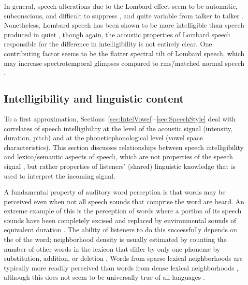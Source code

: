 In general, speech alterations due to the Lombard effect seem to be automatic, subconscious, and difficult to suppress \citep{PickEtAl1989}, and quite variable from talker to talker \citep{Junqua1993}.  Nonetheless, Lombard speech has been shown to be more intelligible than speech produced in quiet \citep{DreherONeill1957, SummersEtAl1988}, though again, the acoustic properties of Lombard speech responsible for the difference in intelligibility is not entirely clear.  One contributing factor seems to be the flatter spectral tilt of Lombard speech, which may increase spectrotemporal glimpses compared to \ac{rms}\=/matched normal speech \citep{LuCooke2009}.


\subsection{Intelligibility and linguistic content\label{sec:IntelLingContent}}
To a first approximation, Sections~\ref{sec:IntelVowel}–\ref{sec:SpeechStyle} deal with correlates of speech intelligibility at the level of the acoustic signal (intensity, duration, pitch) and at the phonetic\slsh phonological level (vowel space characteristics).  This section discusses relationships between speech intelligibility and lexico\-/semantic aspects of speech, which are not properties of the speech signal \perse, but rather properties of listeners’ (shared) linguistic knowledge that is used to interpret the incoming signal.

A fundamental property of auditory word perception is that words may be perceived even when not all speech sounds that comprise the word are heard.  An extreme example of this is the perception of words where a portion of its speech sounds have been completely excised and replaced by environmental sounds of equivalent duration \citep{Warren1970}.  The ability of listeners to do this successfully depends on the  of the word; neighborhood density is usually estimated by counting the number of other words in the lexicon that differ by only one phoneme by substitution, addition, or deletion \citep{LucePisoni1998}.  Words from sparse lexical neighborhoods are typically more readily perceived than words from dense lexical neighborhoods \citep{VitevitchLuce1998, ZieglerEtAl2003}, although this does not seem to be universally true of all languages \citep{VitevitchRodriguez2005}.%

